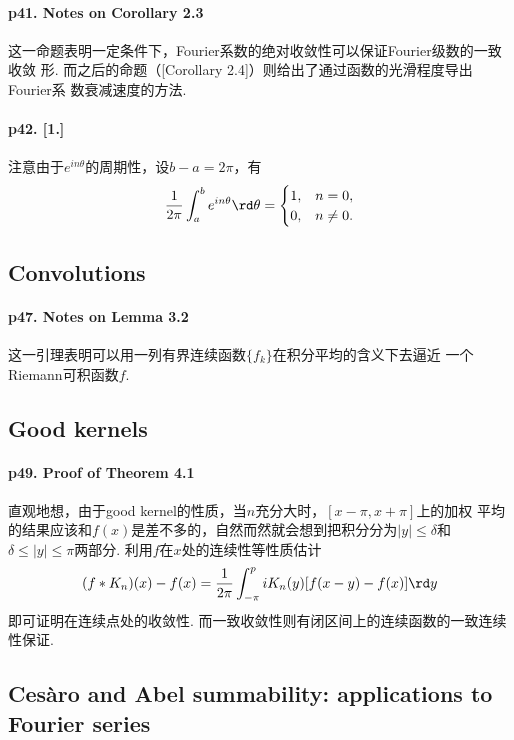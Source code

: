  \paragraph{p41. Notes on Corollary 2.3}
    这一命题表明一定条件下，Fourier系数的绝对收敛性可以保证Fourier级数的一致收敛
    形. 而之后的命题（[Corollary 2.4]）则给出了通过函数的光滑程度导出Fourier系
    数衰减速度的方法.

  \paragraph{p42. [1.]}
    注意由于$e^{in\theta}$的周期性，设$b-a=2\pi$，有
    \[
      \frac{1}{2\pi}\int_{a}^be^{in\theta}\rd\theta = 
      \begin{cases}
        1, & n = 0, \\
        0, & n \ne 0.
      \end{cases}
    \]

\subsection{Convolutions}
  \paragraph{p47. Notes on Lemma 3.2}
    这一引理表明可以用一列有界连续函数$\{f_k\}$在积分平均的含义下去逼近
    一个Riemann可积函数$f$.

\subsection{Good kernels}
  \paragraph{p49. Proof of Theorem 4.1}
    直观地想，由于good kernel的性质，当$n$充分大时，$[x-\pi,x+\pi]$上的加权
    平均的结果应该和$f(x)$是差不多的，自然而然就会想到把积分分为$|y|\le\delta$和
    $\delta\le|y|\le\pi$两部分. 利用$f$在$x$处的连续性等性质估计
    \[
      (f\ast K_n)(x) - f(x) = \frac{1}{2\pi}\int_{-\pi}^pi
      K_n(y)[f(x-y)-f(x)]\rd y
    \]
    即可证明在连续点处的收敛性. 而一致收敛性则有闭区间上的连续函数的一致连续性保证.

\subsection{Cesàro and Abel summability: applications to Fourier series}




